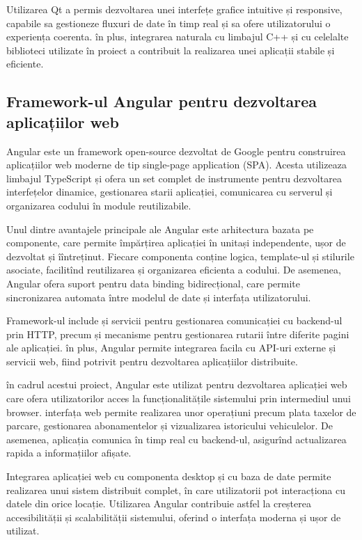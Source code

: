 Utilizarea Qt a permis dezvoltarea unei interfețe grafice intuitive și responsive, capabile sa gestioneze fluxuri de date în timp real și sa ofere utilizatorului o experiența coerenta. în plus, integrarea naturala cu limbajul C++ și cu celelalte biblioteci utilizate în proiect a contribuit la realizarea unei aplicații stabile și eficiente.

\subsection*{Framework-ul Angular pentru dezvoltarea aplicațiilor web}

Angular este un framework open-source dezvoltat de Google pentru construirea aplicațiilor web moderne de tip single-page application (SPA). Acesta utilizeaza limbajul TypeScript și ofera un set complet de instrumente pentru dezvoltarea interfețelor dinamice, gestionarea starii aplicației, comunicarea cu serverul și organizarea codului în module reutilizabile.

Unul dintre avantajele principale ale Angular este arhitectura bazata pe componente, care permite împărțirea aplicației în unitași independente, ușor de dezvoltat și îîntreținut. Fiecare componenta conține logica, template-ul și stilurile asociate, facilitînd reutilizarea și organizarea eficienta a codului. De asemenea, Angular ofera suport pentru data binding bidirecțional, care permite sincronizarea automata între modelul de date și interfața utilizatorului.

Framework-ul include și servicii pentru gestionarea comunicației cu backend-ul prin HTTP, precum și mecanisme pentru gestionarea rutarii între diferite pagini ale aplicației. în plus, Angular permite integrarea facila cu API-uri externe și servicii web, fiind potrivit pentru dezvoltarea aplicațiilor distribuite.

în cadrul acestui proiect, Angular este utilizat pentru dezvoltarea aplicației web care ofera utilizatorilor acces la funcționalitățile sistemului prin intermediul unui browser. interfața web permite realizarea unor operațiuni precum plata taxelor de parcare, gestionarea abonamentelor și vizualizarea istoricului vehiculelor. De asemenea, aplicația comunica în timp real cu backend-ul, asigurînd actualizarea rapida a informațiilor afișate.

Integrarea aplicației web cu componenta desktop și cu baza de date permite realizarea unui sistem distribuit complet, în care utilizatorii pot interacționa cu datele din orice locație. Utilizarea Angular contribuie astfel la creșterea accesibilității și scalabilității sistemului, oferind o interfața moderna și ușor de utilizat.

